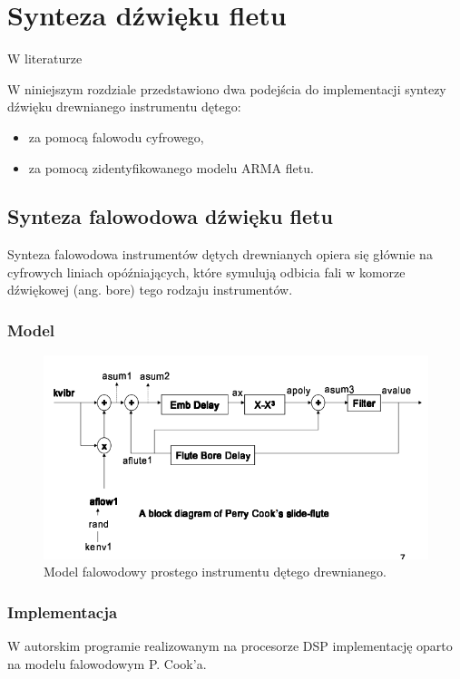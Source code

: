 \section{Synteza dźwięku fletu}

W literaturze 

W niniejszym rozdziale przedstawiono dwa podejścia do implementacji syntezy dźwięku drewnianego instrumentu dętego:
\begin{itemize}
	\setlength\itemsep{-3pt}
	\item za pomocą falowodu cyfrowego,
	\item za pomocą zidentyfikowanego modelu ARMA fletu.
\end{itemize}


\subsection{Synteza falowodowa dźwięku fletu}
Synteza falowodowa instrumentów dętych drewnianych opiera się głównie na cyfrowych liniach opóźniających, które symulują odbicia fali w komorze dźwiękowej (ang. bore) tego rodzaju instrumentów.

\subsubsection{Model}
\begin{figure}[H]
	\centering
	\includegraphics[width=12cm]{grafiki/flute_waveguide_mod}
	\captionsetup{justification=centering}
	\caption{Model falowodowy prostego instrumentu dętego drewnianego.}
	\label{rys:plaszcz_Z}
\end{figure}

\subsubsection{Implementacja}
W autorskim programie realizowanym na procesorze DSP implementację oparto na modelu falowodowym P. Cook'a.


